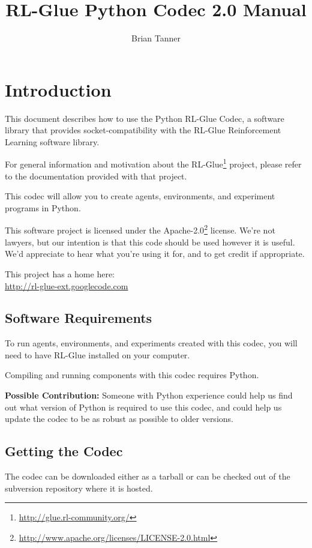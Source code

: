 \documentclass[11pt]{article}
\title{RL-Glue Python Codec 2.0 Manual }
\author{Brian Tanner}
\date{}
\begin{document}
\maketitle
\tableofcontents

\section{Introduction}

This document describes how to use the Python RL-Glue Codec, a software library that provides socket-compatibility with the RL-Glue Reinforcement Learning software library.  

For general information and motivation about the RL-Glue\footnote{\url{http://glue.rl-community.org/}} project, please refer to the documentation provided with that project.

This codec will allow you to create agents, environments, and experiment programs in Python.

This software project is licensed under the Apache-2.0\footnote{\url{http://www.apache.org/licenses/LICENSE-2.0.html}} license. We're not lawyers, but our intention is that this code 
should be used however it is useful.  We'd appreciate to hear what you're using it for, and to get credit if appropriate.

This project has a home here:\\
\url{http://rl-glue-ext.googlecode.com}



\subsection{Software Requirements}
To run agents, environments, and experiments created with this codec, you will need to have RL-Glue installed on your computer.

Compiling and running components with this codec requires Python.

\textbf{Possible Contribution: }Someone with Python experience could help us find out what version of Python is required to use this codec, and could help us update the codec
to be as robust as possible to older versions.

\subsection{Getting the Codec}
The codec can be downloaded either as a tarball or can be checked out of the subversion repository where it is hosted.
\end{document}
